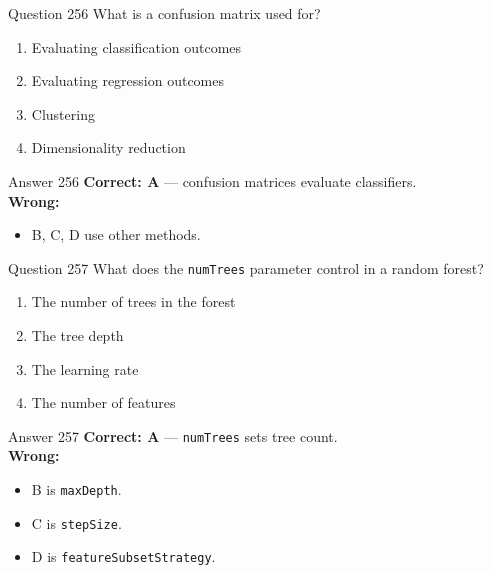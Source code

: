 \documentclass[aspectratio=169,11pt]{beamer}
\begin{document}
	\begin{frame}{Question 256}
		What is a confusion matrix used for?
		\begin{enumerate}[label=\Alph*.]
			\item Evaluating classification outcomes
			\item Evaluating regression outcomes
			\item Clustering
			\item Dimensionality reduction
		\end{enumerate}
	\end{frame}
	\begin{frame}{Answer 256}
		\textbf{Correct: A} --- confusion matrices evaluate classifiers.\\
		\vspace{0.5em}
		\textbf{Wrong:}
		\begin{itemize}
			\item B, C, D use other methods.
		\end{itemize}
	\end{frame}
	
	\begin{frame}{Question 257}
		What does the \texttt{numTrees} parameter control in a random forest?
		\begin{enumerate}[label=\Alph*.]
			\item The number of trees in the forest
			\item The tree depth
			\item The learning rate
			\item The number of features
		\end{enumerate}
	\end{frame}
	\begin{frame}{Answer 257}
		\textbf{Correct: A} --- \texttt{numTrees} sets tree count.\\
		\vspace{0.5em}
		\textbf{Wrong:}
		\begin{itemize}
			\item B is \texttt{maxDepth}.
			\item C is \texttt{stepSize}.
			\item D is \texttt{featureSubsetStrategy}.
		\end{itemize}
	\end{frame}
	
\end{document}
